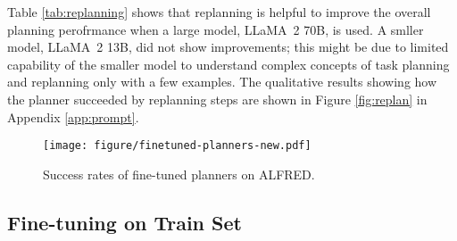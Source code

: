 \begin{wraptable}[9]{r}{7.3cm}
\centering
\vspace{-3mm}
\vspace{-2mm}
\caption{Results with and without replanning. Success rates on ALFRED are reported.}
\label{tab:replanning}
\end{wraptable}
Table \ref{tab:replanning} shows that replanning is helpful to improve the overall planning perofrmance when a large model, LLaMA~2 70B, is used. A smller model, LLaMA~2 13B, did not show improvements; this might be due to limited capability of the smaller model to understand complex concepts of task planning and replanning only with a few examples. The qualitative results showing how the planner succeeded by replanning steps are shown in Figure \ref{fig:replan} in Appendix \ref{app:prompt}.

\begin{wrapfigure}[12]{r}{0.38\textwidth}
\centering
\vspace{-8mm}
\texttt{[image: figure/finetuned-planners-new.pdf]}
\vspace{-6mm}
\caption{Success rates of fine-tuned planners on ALFRED.}
\label{fig:fine-tuning}
\end{wrapfigure}

\subsection{Fine-tuning on Train Set}
\label{subsec:finetuning}

